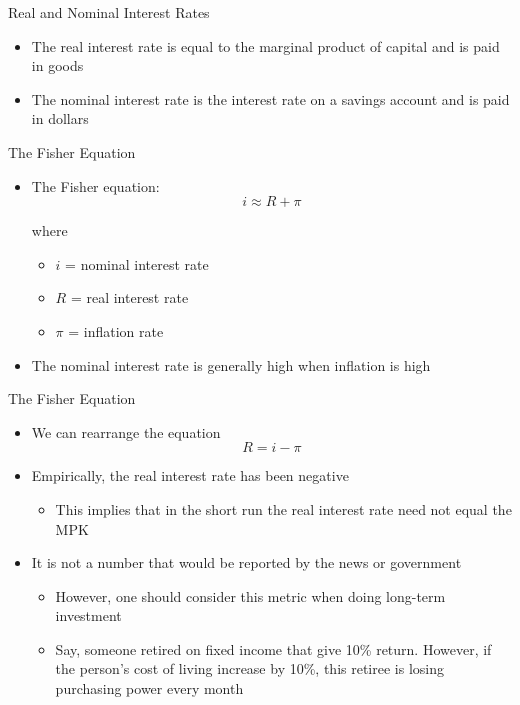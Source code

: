\documentclass[aspectratio=1610]{beamer}
\begin{document}
\begin{frame}[wide]{Real and Nominal Interest Rates}
	\begin{itemize}
		\item The real interest rate is equal to the marginal product of capital and is paid in goods
		\item The nominal interest rate 	is the interest rate on a savings account and is paid in dollars
	\end{itemize}
\end{frame}

\begin{frame}[wide]{The Fisher Equation}
	\begin{itemize}
		\item 	The Fisher equation: 
		\[i \approx R+\pi\]
		
		where
		\begin{itemize}
			\item[] $i$ = nominal interest rate
			\item[] $R$ = real interest rate
			\item[] $\pi$ = inflation rate
		\end{itemize}
		\item The nominal interest rate is generally high when inflation is high
	\end{itemize}
\end{frame}

\begin{frame}[wide]{The Fisher Equation}
	\begin{itemize}
		\item 	We can rearrange the equation
		\[R= i-\pi\]
		\item Empirically, the real interest rate has been negative
		\begin{itemize}
			\item This implies that in the short run the real interest rate need not equal the MPK
		\end{itemize}
		\item It is not a number that would be reported by the news or government
		\begin{itemize}
			\item However, one should consider this metric when doing long-term investment
			\item Say, someone retired on fixed income that give 10\% return. However, if the person's cost of living increase by 10\%, this retiree is losing purchasing power every month
		\end{itemize}
	\end{itemize}
\end{frame}
\end{document}
